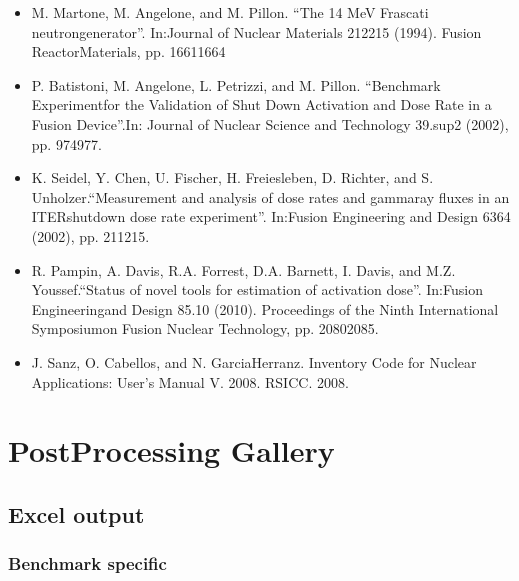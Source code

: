 \documentclass[letterpaper,10pt,english]{sphinxmanual}
\begin{document}
\sphinxAtStartPar
{}
\begin{itemize}
\item {} 
\sphinxAtStartPar
M. Martone, M. Angelone, and M. Pillon. “The 14 MeV Frascati neutrongenerator”.
In:Journal of Nuclear Materials 212\sphinxhyphen{}215 (1994). Fusion ReactorMaterials, pp. 1661\textendash{}1664

\item {} 
\sphinxAtStartPar
P. Batistoni, M. Angelone, L. Petrizzi, and M. Pillon. “Benchmark Experimentfor the
Validation of Shut Down Activation and Dose Rate in a Fusion Device”.In: Journal of Nuclear
Science and Technology 39.sup2 (2002), pp. 974\textendash{}977.

\item {} 
\sphinxAtStartPar
K. Seidel, Y. Chen, U. Fischer, H. Freiesleben, D. Richter, and S. Unholzer.“Measurement
and analysis of dose rates and gamma\sphinxhyphen{}ray fluxes in an ITERshut\sphinxhyphen{}down dose rate experiment”.
In:Fusion Engineering and Design 63\sphinxhyphen{}64 (2002), pp. 211\textendash{}215.

\item {} 
\sphinxAtStartPar
R. Pampin, A. Davis, R.A. Forrest, D.A. Barnett, I. Davis, and M.Z. Youssef.“Status of novel
tools for estimation of activation dose”. In:Fusion Engineeringand Design 85.10 (2010).
Proceedings of the Ninth International Symposiumon Fusion Nuclear Technology, pp. 2080\textendash{}2085.

\item {} 
\sphinxAtStartPar
J. Sanz, O. Cabellos, and N. Garcia\sphinxhyphen{}Herranz. Inventory Code for Nuclear Applications:
User’s Manual V. 2008. RSICC. 2008.

\end{itemize}




\chapter{Post\sphinxhyphen{}Processing Gallery}
\label{\detokenize{usage/postprocessing:post-processing-gallery}}\label{\detokenize{usage/postprocessing::doc}}

\section{Excel output}
\label{\detokenize{usage/postprocessing:excel-output}}

\subsection{Benchmark specific}
\label{\detokenize{usage/postprocessing:benchmark-specific}}
\end{document}
